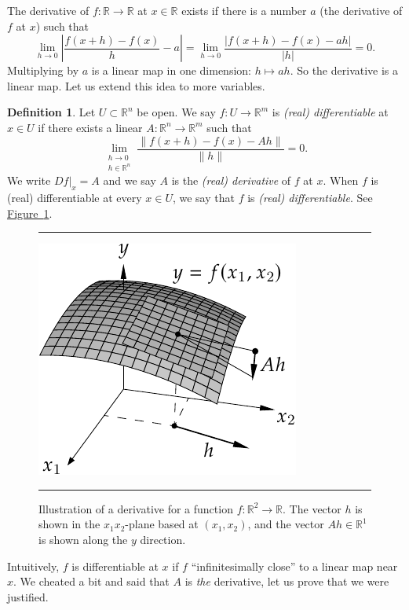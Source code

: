 \documentclass[12pt,openany]{book}
\newcommand{\sabs}[1]{\lvert {#1} \rvert}
\newcommand{\snorm}[1]{\lVert {#1} \rVert}
\newcommand{\abs}[1]{\left\lvert {#1} \right\rvert}
\newcommand{\R}{{\mathbb{R}}}
\newcommand{\myquote}[1]{``#1''}
\theoremstyle{plain}
\theoremstyle{remark}
\theoremstyle{definition}
\newtheorem{defn}[thm]{Definition}
\newenvironment{myfig}{%
\begin{figure}[h!t]
\noindent\rule{\textwidth}{0.5pt}\vspace{12pt}\par\centering}%
{\par\noindent\rule{\textwidth}{0.5pt}
\end{figure}}
\theoremstyle{exercise}
\theoremstyle{example}
\newcommand{\figureref}[1]{\hyperref[#1]{Figure~\ref*{#1}}}
\begin{document}
The derivative of $f \colon \R \to \R$ at $x \in \R$
exists if there is a number $a$ (the derivative of $f$ at $x$) such that
\begin{equation*}
\lim_{h \to 0} \abs{\frac{f(x+h)-f(x)}{h} - a} =
\lim_{h \to 0} \frac{\sabs{f(x+h)-f(x) - ah}}{\sabs{h}}
= 0.
\end{equation*}
Multiplying by $a$ is a linear map in one dimension:
$h \mapsto ah$.  So the derivative is a linear map.
Let us extend this idea to more variables.

\begin{defn}
Let $U \subset \R^n$ be open.  We say $f \colon U \to \R^m$
is \emph{(real) differentiable}
at $x \in U$ if there exists
a linear $A \colon \R^n \to \R^m$ such that
\begin{equation*}
\lim_{\substack{h \to 0\\h\in \R^n}}
\frac{\snorm{f(x+h)-f(x) - Ah}}{\snorm{h}} = 0 .
\end{equation*}
We write $Df|_x = A$ and
we say $A$ is the \emph{(real) derivative} of $f$ at $x$.
When $f$ is (real) differentiable at
every $x \in U$, we say that $f$ is \emph{(real) differentiable}.  See
\figureref{fig:svder}.
\end{defn}

\begin{myfig}
\includegraphics{figures/svder}
\caption{Illustration of a derivative for a function $f \colon \R^2 \to \R$.  The vector $h$ is shown
in the $x_1x_2$-plane based at $(x_1,x_2)$, and the vector
$Ah \in \R^1$ is shown along the $y$ direction.\label{fig:svder}}
\end{myfig}

Intuitively, $f$ is differentiable at $x$ if $f$ \myquote{infinitesimally close}
to a linear map near $x$.
We cheated a bit and said that $A$
is \emph{the} derivative, let us prove that we were justified.
\end{document}
